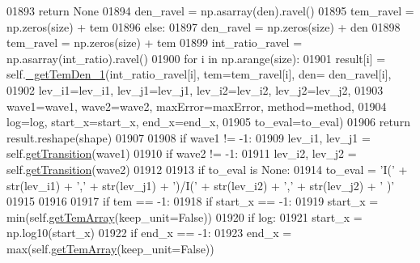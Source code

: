 \begin{DoxyCode}
01893                     \textcolor{keywordflow}{return} \textcolor{keywordtype}{None}
01894                 den\_ravel = np.asarray(den).ravel()
01895                 tem\_ravel = np.zeros(size) + tem
01896             \textcolor{keywordflow}{else}:
01897                 den\_ravel = np.zeros(size) + den
01898                 tem\_ravel = np.zeros(size) + tem
01899             int\_ratio\_ravel = np.asarray(int\_ratio).ravel()
01900             \textcolor{keywordflow}{for} i \textcolor{keywordflow}{in} np.arange(size):
01901                 result[i] = self.\hyperlink{classpyneb_1_1core_1_1pynebcore_1_1_atom_ad1d75f64b27a6acee079b5738b69dabe}{\_getTemDen\_1}(int\_ratio\_ravel[i], tem=tem\_ravel[i], den=
      den\_ravel[i],
01902                                            lev\_i1=lev\_i1, lev\_j1=lev\_j1, lev\_i2=lev\_i2, lev\_j2=lev\_j2,
01903                                            wave1=wave1, wave2=wave2, maxError=maxError, method=method,
01904                                            log=log, start\_x=start\_x, end\_x=end\_x,
01905                                            to\_eval=to\_eval)
01906             \textcolor{keywordflow}{return} result.reshape(shape)
01907             
01908         \textcolor{keywordflow}{if} wave1 != -1:
01909             lev\_i1, lev\_j1 = self.\hyperlink{classpyneb_1_1core_1_1pynebcore_1_1_atom_a7c9f17a3d9e841267add92377d9d1ede}{getTransition}(wave1)
01910         \textcolor{keywordflow}{if} wave2 != -1:
01911             lev\_i2, lev\_j2 = self.\hyperlink{classpyneb_1_1core_1_1pynebcore_1_1_atom_a7c9f17a3d9e841267add92377d9d1ede}{getTransition}(wave2)
01912 
01913         \textcolor{keywordflow}{if} to\_eval \textcolor{keywordflow}{is} \textcolor{keywordtype}{None}:
01914             to\_eval = \textcolor{stringliteral}{'I('} + str(lev\_i1) + \textcolor{stringliteral}{','} + str(lev\_j1) + \textcolor{stringliteral}{')/I('} + str(lev\_i2) + \textcolor{stringliteral}{','} + str(lev\_j2) + \textcolor{stringliteral}{'
      )'}
01915 
01916 
01917         \textcolor{keywordflow}{if} tem == -1:
01918             \textcolor{keywordflow}{if} start\_x == -1:
01919                 start\_x = min(self.\hyperlink{classpyneb_1_1core_1_1pynebcore_1_1_atom_a764cc048a87d3d89204a616774bdaac6}{getTemArray}(keep\_unit=\textcolor{keyword}{False}))
01920                 \textcolor{keywordflow}{if} log:
01921                     start\_x = np.log10(start\_x)
01922             \textcolor{keywordflow}{if} end\_x == -1:
01923                 end\_x = max(self.\hyperlink{classpyneb_1_1core_1_1pynebcore_1_1_atom_a764cc048a87d3d89204a616774bdaac6}{getTemArray}(keep\_unit=\textcolor{keyword}{False}))

\end{DoxyCode}
